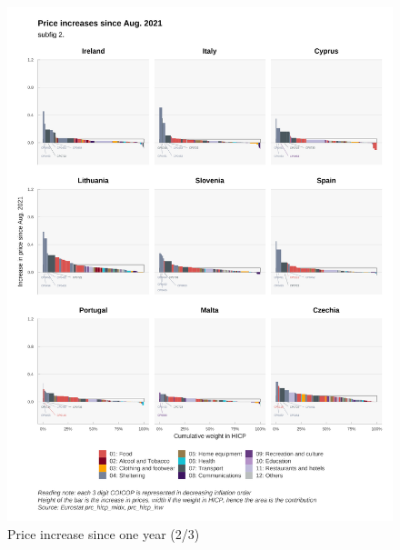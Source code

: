 \documentclass[
  9pt,
  a4paper,
  numbers=noendperiod,
  DIV=12]{scrartcl}
\begin{document}
\begin{figure}

\caption{Price increase since one year (2/3)}

{\centering \includegraphics{../svg/depuis_1y_2.png}

}

\end{figure}
\end{document}
